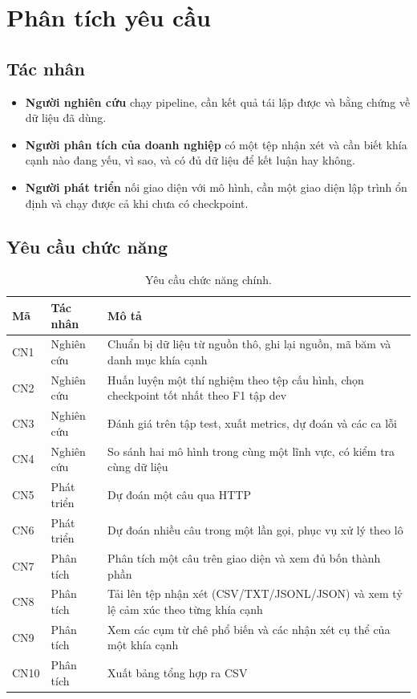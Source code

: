 \documentclass[12pt,a4paper]{report}
\begin{document}
\chapter{Phân tích yêu cầu}
\label{chap:yeucau}

\section{Tác nhân}

\begin{itemize}
  \item \textbf{Người nghiên cứu} chạy pipeline, cần kết quả tái lập được và bằng chứng về dữ liệu đã dùng.
  \item \textbf{Người phân tích của doanh nghiệp} có một tệp nhận xét và cần biết khía cạnh nào đang yếu, vì sao, và có
        đủ dữ liệu để kết luận hay không.
  \item \textbf{Người phát triển} nối giao diện với mô hình, cần một giao diện lập trình ổn định và chạy được cả khi
        chưa có checkpoint.
\end{itemize}

\section{Yêu cầu chức năng}

\begin{table}[H]
\centering
\caption{Yêu cầu chức năng chính.}
\begin{tabularx}{\linewidth}{@{}llX@{}}
\toprule
\textbf{Mã} & \textbf{Tác nhân} & \textbf{Mô tả} \\
\midrule
CN1 & Nghiên cứu & Chuẩn bị dữ liệu từ nguồn thô, ghi lại nguồn, mã băm và danh mục khía cạnh \\
CN2 & Nghiên cứu & Huấn luyện một thí nghiệm theo tệp cấu hình, chọn checkpoint tốt nhất theo F1 tập dev \\
CN3 & Nghiên cứu & Đánh giá trên tập test, xuất metrics, dự đoán và các ca lỗi \\
CN4 & Nghiên cứu & So sánh hai mô hình trong cùng một lĩnh vực, có kiểm tra cùng dữ liệu \\
CN5 & Phát triển & Dự đoán một câu qua HTTP \\
CN6 & Phát triển & Dự đoán nhiều câu trong một lần gọi, phục vụ xử lý theo lô \\
CN7 & Phân tích & Phân tích một câu trên giao diện và xem đủ bốn thành phần \\
CN8 & Phân tích & Tải lên tệp nhận xét (CSV/TXT/JSONL/JSON) và xem tỷ lệ cảm xúc theo từng khía cạnh \\
CN9 & Phân tích & Xem các cụm từ chê phổ biến và các nhận xét cụ thể của một khía cạnh \\
CN10 & Phân tích & Xuất bảng tổng hợp ra CSV \\
\bottomrule
\end{tabularx}
\end{table}
\end{document}
